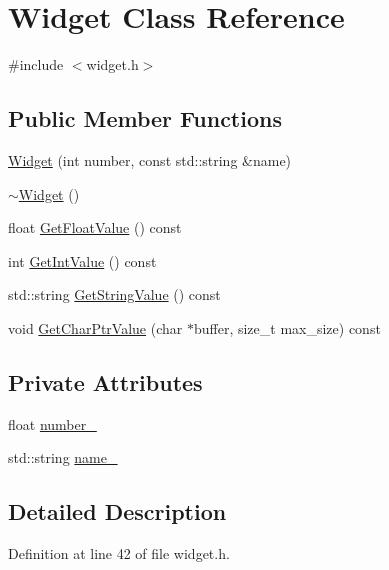 \hypertarget{classWidget}{\section{\-Widget \-Class \-Reference}
\label{dd/ddb/classWidget}
}


{\ttfamily \#include $<$widget.\-h$>$}

\subsection*{\-Public \-Member \-Functions}
\begin{DoxyCompactItemize}
\item 
\hyperlink{classWidget_a609188456bedb4589b2690618606418c}{\-Widget} (int number, const std\-::string \&name)
\item 
\hyperlink{classWidget_ae4171a22a36c0a394704c594fd856b0e}{$\sim$\-Widget} ()
\item 
float \hyperlink{classWidget_add5b557122d90f9a891d6b981e3ac305}{\-Get\-Float\-Value} () const 
\item 
int \hyperlink{classWidget_a026ef91588c09c091efb7c40bb73d4dc}{\-Get\-Int\-Value} () const 
\item 
std\-::string \hyperlink{classWidget_a3995da0370e2ada1bf62a38fa44f8239}{\-Get\-String\-Value} () const 
\item 
void \hyperlink{classWidget_a6ccc7f701c942a62d55aecd193f4207c}{\-Get\-Char\-Ptr\-Value} (char $\ast$buffer, size\-\_\-t max\-\_\-size) const 
\end{DoxyCompactItemize}
\subsection*{\-Private \-Attributes}
\begin{DoxyCompactItemize}
\item 
float \hyperlink{classWidget_a9a0a06520c913b964c1c812d6beae9a3}{number\-\_\-}
\item 
std\-::string \hyperlink{classWidget_a4d739cc5d335052eb9f5b2ca559b81d1}{name\-\_\-}
\end{DoxyCompactItemize}


\subsection{\-Detailed \-Description}


\-Definition at line 42 of file widget.\-h.



